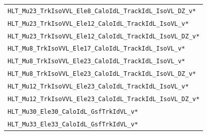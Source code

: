 \begin{table}[htb]
\begin{tabular}[width=\textwidth]{l}
  \verb|HLT_Mu23_TrkIsoVVL_Ele8_CaloIdL_TrackIdL_IsoVL_DZ_v*|                     \\
  \verb|HLT_Mu23_TrkIsoVVL_Ele12_CaloIdL_TrackIdL_IsoVL_v*|                     \\
  \verb|HLT_Mu23_TrkIsoVVL_Ele12_CaloIdL_TrackIdL_IsoVL_DZ_v*|                     \\
  \verb|HLT_Mu8_TrkIsoVVL_Ele17_CaloIdL_TrackIdL_IsoVL_v*|                     \\
  \verb|HLT_Mu8_TrkIsoVVL_Ele23_CaloIdL_TrackIdL_IsoVL_v*|                     \\
  \verb|HLT_Mu8_TrkIsoVVL_Ele23_CaloIdL_TrackIdL_IsoVL_DZ_v*|                     \\
  \verb|HLT_Mu12_TrkIsoVVL_Ele23_CaloIdL_TrackIdL_IsoVL_v*|                     \\
  \verb|HLT_Mu12_TrkIsoVVL_Ele23_CaloIdL_TrackIdL_IsoVL_DZ_v*|                     \\
  \verb|HLT_Mu30_Ele30_CaloIdL_GsfTrkIdVL_v*|                     \\
  \verb|HLT_Mu33_Ele33_CaloIdL_GsfTrkIdVL_v*|                     \\
  \hline
 \end{tabular}
\end{table}




